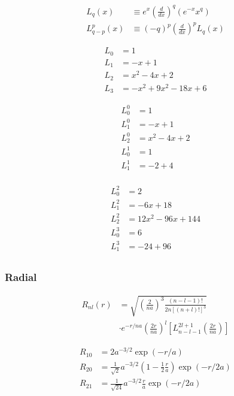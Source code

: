 \documentclass[8pt]{amsart}
\newcommand{\der}[2][]{\frac{d#1}{d#2}}
\begin{document}
\begin{multicols}{3}
\begin{align*}
  L_q(x)&\equiv e^x\left(\der{x}\right)^q(e^{-x}x^q)\\
  L_{q-p}^p(x)&\equiv(-q)^p\left(\der{x}\right)^pL_q(x)
\end{align*}

\begin{align*}
  L_0&=1\\
  L_1&=-x+1\\
  L_2&=x^2-4x+2\\
  L_3&=-x^2+9x^2-18x+6
\end{align*}

\begin{multicols}{2}
  \begin{align*}
    L_0^0&=1\\
    L_1^0&=-x+1\\
    L_2^0&=x^2-4x+2\\
    L_0^1&=1\\
    L_1^1&=-2+4\\
  \end{align*}

  \begin{align*}
    L_0^2&=2\\
    L_1^2&=-6x+18\\
    L_2^2&=12x^2-96x+144\\
    L_0^3&=6\\
    L_1^3&=-24+96\\
  \end{align*}
\end{multicols}

\subsubsection{Radial}%
\label{ssub:radial}

\begin{align*}
  R_{nl}(r)&=\sqrt{\left(\frac{2}{na}\right)^3\frac{(n-l-1)!}{2n\left[(n+l)!\right]^3}}\\ &\cdot e^{-r/na}\left(\frac{2r}{na}\right)^l\left[L_{n-l-1}^{2l+1}\left(\frac{2r}{na}\right)\right]
\end{align*}

\begin{align*}
  R_{10}&=2a^{-3/2}\exp(-r/a)\\
  R_{20}&=\frac{1}{\sqrt{2}}a^{-3/2}\left(1-\frac{1}{2}\frac{r}{a}\right)\exp(-r/2a)\\
  R_{21}&=\frac{1}{\sqrt{24}}a^{-3/2}\frac{r}{a}\exp(-r/2a)\\
\end{align*}


\end{multicols}
\end{document}
